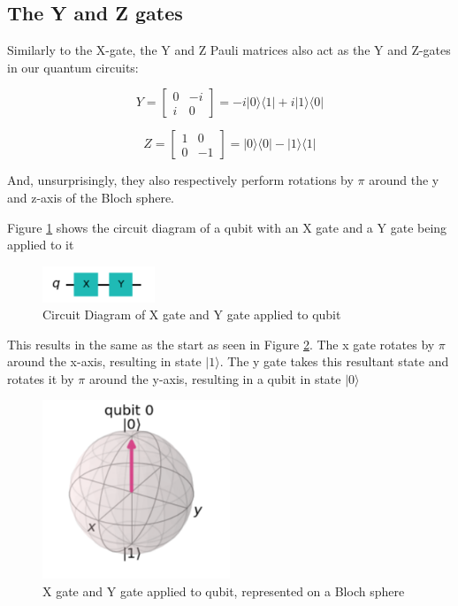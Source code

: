 \subsection{The Y and Z gates}


Similarly to the X-gate, the Y and Z Pauli matrices also act as the Y and Z-gates in our quantum circuits:


$$ Y = \begin{bmatrix} 0 & -i \\ i & 0 \end{bmatrix} = -i|0\rangle\langle1| + i|1\rangle\langle0| $$

$$ Z = \begin{bmatrix} 1 & 0 \\ 0 & -1 \end{bmatrix} = |0\rangle\langle0| - |1\rangle\langle1| $$

And, unsurprisingly, they also respectively perform rotations by $\pi$ around the y and z-axis of the Bloch sphere.

Figure \ref{fig:xyGateDiagram} shows the circuit diagram of a qubit with an X gate and a Y gate being applied to it%

\begin{figure}[h]
    \centering
    \includegraphics[width=0.3\textwidth]{lab2/images/xyGate.png}
    \caption{Circuit Diagram of X gate and Y gate applied to qubit} 
    \label{fig:xyGateDiagram}
\end{figure}

This results in the same as the start as seen in Figure \ref{fig:xyGateBloc}. The x gate rotates by $\pi$ around the x-axis, resulting in state $|1\rangle$. The y gate takes this resultant state and rotates it by $\pi$ around the y-axis, resulting in a qubit in state $|0\rangle$

\begin{figure}[h]
    \centering
    \includegraphics[width=0.5\textwidth]{lab2/images/bSphX1.png}
    \caption{X gate and Y gate applied to qubit, represented on a Bloch sphere} 
    \label{fig:xyGateBloc}
\end{figure}

